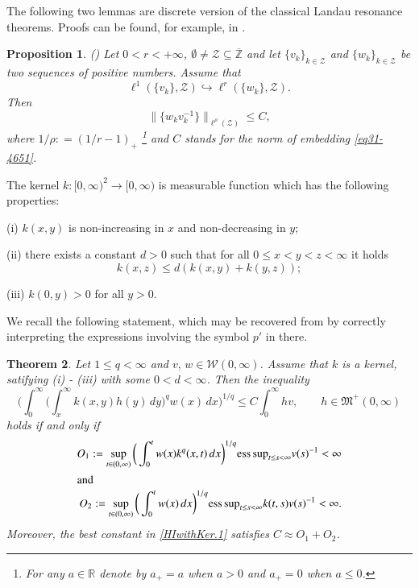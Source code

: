 \documentclass[12pt]{amsart}
\theoremstyle{plain}
\newtheorem{thm}{Theorem}[section]
\newtheorem{prop}[thm]{Proposition}
\theoremstyle{definition}
\numberwithin{thm}{section}
\numberwithin{equation}{section}
\begin{document}
The following two lemmas are discrete version of the classical
Landau resonance theorems. Proofs can be found, for example, in
\cite{gp1}.
\begin{prop}\label{prop.2.1}{\rm(\cite[Proposition 4.1]{gp1})}
	Let $0 < r < +\infty$, $\emptyset \neq {\mathcal Z} \subseteq
	\overline{\mathbb Z}$ and let $\{v_k\}_{k\in{\mathcal Z}}$ and $\{w_k\}_{k\in{\mathcal Z}}$ be
	two sequences of positive numbers. Assume that
	\begin{equation}\label{eq31-4651}
	\ell^1 (\{v_k\},{\mathcal Z}) \hookrightarrow \ell^r (\{w_k\},{\mathcal Z}).
	\end{equation}
	Then
	\begin{equation*}\label{eq31-46519009}
	\big\|\big\{w_k v_k^{-1}\big\}\big\|_{\ell^\rho({\mathcal Z})} \le C,
	\end{equation*}
	where $1 / \rho : = ( 1 / r - 1)_+$ \footnote{For any $a\in{\mathbb R}$ denote
		by $a_+ = a$ when $a>0$ and $a_+ = 0$ when $a \le 0$.} and $C$ stands for the norm of
	embedding \eqref{eq31-4651}.
\end{prop}

The kernel $k : [0,\infty)^2 \longrightarrow [0,\infty)$ is measurable function which has the following properties:

{\rm (i)} $k(x,y)$ is non-increasing in $x$ and non-decreasing in $y$;

{\rm (ii)} there exists a constant $d > 0$ such that for all $0 \le x < y < z < \infty$ it holds
$$
k(x,z) \le d(k(x,y) + k (y,z));
$$

{\rm (iii)} $k(0,y) > 0$ for all $y > 0$.

We recall the following statement, which may be recovered from \cite[Theorem 1.1]{Oinar} by correctly interpreting the expressions involving the symbol $p'$ in there.
\begin{thm}\cite[Theorem 1.1]{Oinar}\label{Oinar}
	Let $1 \le q < \infty$ and $v,\, w \in {\mathcal W}{(0,\infty)}$. Assume that $k$ is a kernel, satifying (i) - (iii) with some $0 < d < \infty$. Then the inequality
	\begin{equation}\label{HIwithKer.1}
	\bigg( \int_0^{\infty} \bigg( \int_x^{\infty} k(x,y) h(y)\,dy \bigg)^q w(x)\,dx\bigg)^{1/q} \le C \int_0^{\infty} hv, \qquad h \in {{\mathfrak M}}^+ (0,\infty)
	\end{equation}
	holds if and only if
	\begin{align*}
	O_1 : = \sup_{t \in (0,\infty)} \bigg( \int_0^t w(x) k^q (x,t) \,dx\bigg)^{1/q} {\operatornamewithlimits{ess\,sup}}_{t \le  s < \infty} v(s)^{-1} < \infty \\
	\intertext{and}
	O_2 : = \sup_{t \in (0,\infty)} \bigg( \int_0^t w(x)\,dx\bigg)^{1/q} {\operatornamewithlimits{ess\,sup}}_{t \le  s < \infty} k (t,s) v(s)^{-1} < \infty.
	\end{align*} 
	Moreover, the best constant in \eqref{HIwithKer.1} satisfies $C \approx O_1 + O_2$.
\end{thm}	
\end{document}
